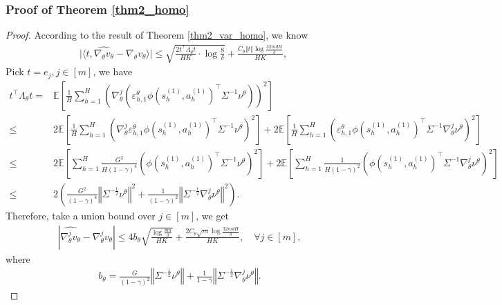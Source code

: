 \documentclass{article}
\numberwithin{equation}{section}
\begin{document}
\subsubsection{Proof of Theorem \ref{thm2_homo}}
\label{pfthm2_homo}
\begin{proof}
According to the result of Theorem \ref{thm2_var_homo}, we know
\begin{align*}
    &\vert\langle t,\widehat{\nabla_\theta v_\theta}-\nabla_\theta v_\theta\rangle\vert\leq\sqrt{\frac{2t^\top\Lambda_\theta t}{HK}\cdot\log\frac{8}{\delta}}+\frac{C_\theta\Vert t\Vert\log\frac{32mdH}{\delta}}{HK},
\end{align*}
Pick $t=e_j, j\in[m]$, we have
\begin{align*}
    t^\top \Lambda_\theta t=&\mathbb{E}\left[\frac{1}{H}\sum_{h=1}^H\left(\nabla_\theta^j\left(\varepsilon^\theta_{h,1}\phi\left(s_h^{(1)},a_h^{(1)}\right)^\top\Sigma^{-1}\nu^\theta\right)\right)^2\right]\\
    \leq&2\mathbb{E}\left[\frac{1}{H}\sum_{h=1}^H\left(\nabla_\theta^j\varepsilon^\theta_{h,1}\phi\left(s_h^{(1)},a_h^{(1)}\right)^\top\Sigma^{-1}\nu^\theta\right)^2\right]+2\mathbb{E}\left[\frac{1}{H}\sum_{h=1}^H\left(\varepsilon^\theta_{h,1}\phi\left(s_h^{(1)},a_h^{(1)}\right)^\top\Sigma^{-1}\nabla_\theta^j\nu^\theta\right)^2\right]\\
    \leq&2\mathbb{E}\left[\sum_{h=1}^H\frac{G^2}{H(1-\gamma)^4}\left(\phi\left(s_h^{(1)},a_h^{(1)}\right)^\top\Sigma^{-1}\nu^\theta\right)^2\right]+2\mathbb{E}\left[\sum_{h=1}^H\frac{1}{H(1-\gamma)^2}\left(\phi\left(s_h^{(1)},a_h^{(1)}\right)^\top\Sigma^{-1}\nabla_\theta^j\nu^\theta\right)^2\right]\\
     \leq&2\left(\frac{G^2}{(1-\gamma)^4}\left\Vert\Sigma^{-\frac{1}{2}}\nu^\theta\right\Vert^2+\frac{1}{(1-\gamma)^2}\left\Vert\Sigma^{-\frac{1}{2}}\nabla_\theta^j\nu^\theta\right\Vert^2\right).
\end{align*}
Therefore, take a union bound over $j\in[m]$, we get
\begin{align*}
\left\vert\widehat{\nabla_\theta^j v_\theta}-\nabla_\theta^j v_\theta\right\vert\leq 4b_\theta\sqrt{\frac{\log\frac{8m}{\delta}}{HK}}+\frac{2C_\theta\sqrt{m}\log\frac{32mdH}{\delta}}{HK},\quad\forall j\in[m],
\end{align*}
where 
\begin{align*}
b_\theta=\frac{G}{(1-\gamma)^2}\left\Vert\Sigma^{-\frac{1}{2}}\nu^\theta\right\Vert+\frac{1}{1-\gamma}\left\Vert\Sigma^{-\frac{1}{2}}\nabla_\theta^j\nu^\theta\right\Vert.
\end{align*}

\end{proof}
\end{document}
